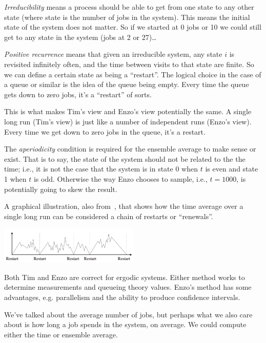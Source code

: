 \textit{Irreducibility} means a process should be able to get from one state to any other state (where state is the number of jobs in the system). This means the initial state of the system does not matter. So if we started at 0 jobs or 10 we could still get to any state in the system (jobs at 2 or 27)\ldots

\textit{Positive recurrence} means that given an irreducible system, any state $i$ is revisited infinitely often, and the time between visits to that state are finite. So we can define a certain state as being a ``restart''. The logical choice in the case of a queue or similar is the idea of the queue being empty. Every time the queue gets down to zero jobs, it's a ``restart'' of sorts. 

This is what makes Tim's view and Enzo's view potentially the same. A single long run (Tim's view) is just like a number of independent runs (Enzo's view). Every time we get down to zero jobs in the queue, it's a restart. 

The \textit{aperiodicity} condition is required for the ensemble average to make sense or exist. That is to say, the state of the system should not be related to the the time; i.e., it is not the case that the system is in state 0 when $t$ is even and state 1 when $t$ is odd. Otherwise the way Enzo chooses to sample, i.e., $t = 1000$, is potentially going to skew the result.

A graphical illustration, also from~\cite{pmd}, that shows how the time average over a single long run can be considered a chain of restarts or ``renewals''.

\begin{center}
	\includegraphics[width=0.5\textwidth]{images/systemrestart.png}
\end{center}

Both Tim and Enzo are correct for ergodic systems. Either method works to determine measurements and queueing theory values. Enzo's method has some advantages, e.g. parallelism and the ability to produce confidence intervals.

We've talked about the average number of jobs, but perhaps what we also care about is how long a job spends in the system, on average. We could compute either the time or ensemble average. 

